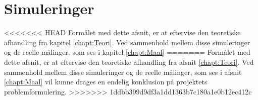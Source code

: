 \chapter{Simuleringer}
<<<<<<< HEAD
\label{chap:sim}
Formålet med dette afsnit, er at eftervise den teoretiske afhandling fra kapitel \ref{chapt:Teori}. Ved sammenhold mellem disse simuleringer og de reelle målinger, som ses i kapitel \ref{chapt:Maal}
=======
Formålet med dette afsnit, er at eftervise den teoretiske afhandling fra afsnit \ref{chapt:Teori}. Ved sammenhold mellem disse simuleringer og de reelle målinger, som ses i afsnit \ref{chapt:Maal} vil kunne drages en endelig konklusion på projektets problemformulering. 
>>>>>>> 1ddbb399d9df3a1dd1363b7c180a1e0b12ec412c



%
